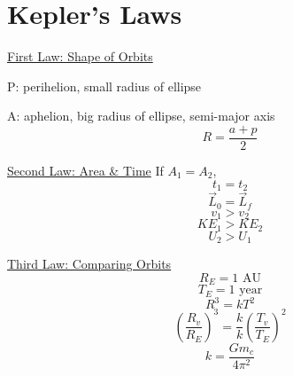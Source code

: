 \documentclass[fleqn]{article}
\begin{document}
\setlength{\mathindent}{0pt}
\section*{Kepler's Laws}
\underline{First Law: Shape of Orbits}

P: perihelion, small radius of ellipse

A: aphelion, big radius of ellipse, semi-major axis
\[ R=\frac{a+p}{2}  \]

\underline{Second Law: Area \& Time}
If $A_1=A_2$,
\[ t_1=t_2 \]
\[ \vec{L}_{0}  = \vec{L}_{f}    \]
\[ v_1 > v_2 \]
\[ KE_1 > KE_2 \]
\[ U_2 > U_1 \]

\underline{Third Law: Comparing Orbits}
\[ R_E = 1 \text{ AU}  \]
\[ T_E = 1 \text{ year}  \]
\[ R^3 = kT^2 \]
\[ \left( \frac{R_v}{R_E} \right)^3 = \frac{k}{k} \left( \frac{T_v}{T_E}  \right)^2 \]
\[ k = \frac{Gm_c}{4 \pi ^2}  \]
\end{document}

